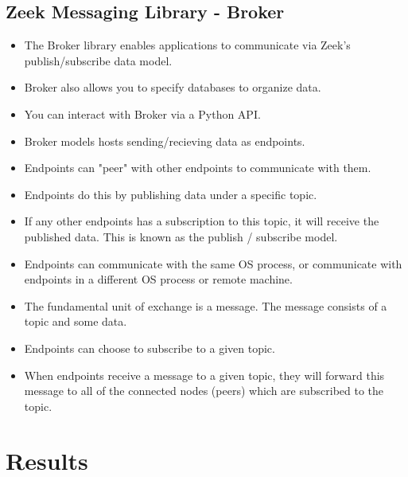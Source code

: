 \documentclass{article}
\begin{document}
\subsection{Zeek Messaging Library - Broker}
\begin{itemize}
    \item The Broker library enables applications to communicate via Zeek's publish/subscribe data model.
    \item Broker also allows you to specify databases to organize data.
    \item You can interact with Broker via a Python API.
    \item Broker models hosts sending/recieving data as endpoints.
    \item Endpoints can "peer" with other endpoints to communicate with them. \item Endpoints do this by publishing data under a specific topic.
    \item If any other endpoints has a subscription to this topic, it will receive the published data. This is known as the publish / subscribe model.
    \item Endpoints can communicate with the same OS process, or communicate with endpoints in a different OS process or remote machine.
    \item The fundamental unit of exchange is a message. The message consists of a topic and some data.
    \item Endpoints can choose to subscribe to a given topic.
    \item When endpoints receive a message to a given topic, they will forward this message to all of the connected nodes (peers) which are subscribed to the topic.
\end{itemize}
\section{Results}
\end{document}
